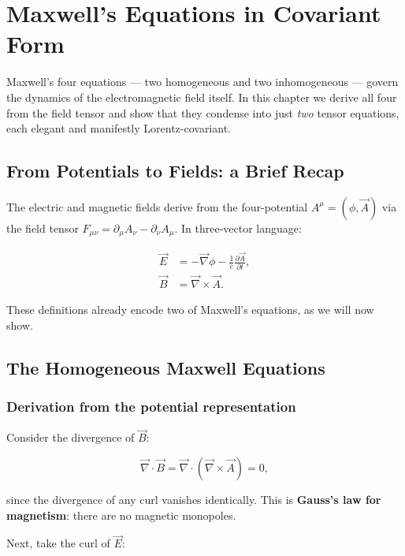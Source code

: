\chapter{Maxwell's Equations in Covariant Form}

Maxwell's four equations --- two homogeneous and two inhomogeneous --- govern the dynamics of the electromagnetic field itself. In this chapter we derive all four from the field tensor and show that they condense into just \emph{two} tensor equations, each elegant and manifestly Lorentz-covariant.

\section{From Potentials to Fields: a Brief Recap}

The electric and magnetic fields derive from the four-potential $A^\mu = (\phi, \vec{A})$ via the field tensor $F_{\mu\nu} = \partial_\mu A_\nu - \partial_\nu A_\mu$. In three-vector language:

\begin{align}
\vec{E} &= -\vec{\nabla}\phi - \frac{1}{c}\frac{\partial \vec{A}}{\partial t}, \label{eq:E_from_pot}\\
\vec{B} &= \vec{\nabla}\times\vec{A}. \label{eq:B_from_pot}
\end{align}

These definitions already encode two of Maxwell's equations, as we will now show.

\section{The Homogeneous Maxwell Equations}

\subsection{Derivation from the potential representation}

Consider the divergence of $\vec{B}$:

\begin{equation}
\vec{\nabla}\cdot\vec{B} = \vec{\nabla}\cdot(\vec{\nabla}\times\vec{A}) = 0,
\end{equation}

since the divergence of any curl vanishes identically. This is \textbf{Gauss's law for magnetism}: there are no magnetic monopoles.

Next, take the curl of $\vec{E}$:

